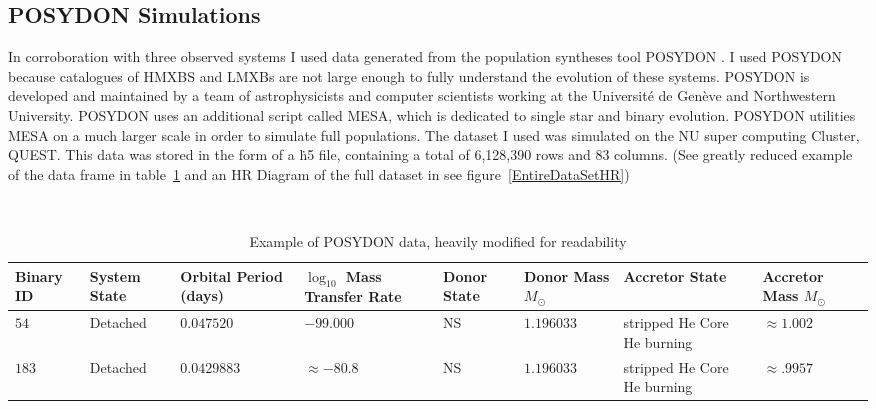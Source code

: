 \documentclass[12pt, a4paper]{article}
\begin{document}
    \subsection{POSYDON Simulations}
        In corroboration with three observed systems I used data generated from the population syntheses tool POSYDON \parencite{Fragos_2023}. I used POSYDON because catalogues of HMXBS and LMXBs are not large enough to fully understand the evolution of these systems. POSYDON is developed and maintained by a team of astrophysicists and computer scientists working at the Université de Genève and Northwestern University. POSYDON uses an additional script called MESA, which is dedicated to single star and binary evolution. POSYDON utilities MESA on a much larger scale in order to simulate full populations. The dataset I used was simulated on the NU super computing Cluster, QUEST. This data was stored in the form of a \.h5 file, containing a total of 6,128,390 rows and 83 columns. (See greatly reduced example of the data frame in table~\ref{POSYDONDataExample} and an HR Diagram of the full dataset in see figure~\ref{EntireDataSetHR})

         \begin{table}[H]
            \centering\
            \footnotesize
            \begin{tabularx}{\textwidth}{||X | X | X | X | X | X | X | X ||}
                \hline 
                \textbf{Binary ID} & 
                \textbf{System State} & 
                \textbf{Orbital Period (days)} & 
                \boldmath$\log_{10}$ \textbf{Mass Transfer Rate} & 
                \textbf{Donor State} & 
                \textbf{Donor Mass} $M_\odot$ & 
                \textbf{Accretor State} & 
                \textbf{Accretor Mass} $M_\odot$
                \\ \hline \hline
                $54$ & Detached & $0.047520$ & $-99.000$ & NS & $1.196033$ & stripped He Core He burning & $\approx 1.002$ \\
                \hline
                $183$ & Detached & $0.0429883$ & $ \approx -80.8$ & NS & $1.196033$ & stripped He Core He burning & $\approx .9957$ \\
                \hline
            \end{tabularx}
            \caption{Example of POSYDON data, heavily modified for readability}
            \label{POSYDONDataExample}
        \end{table}
\end{document}

